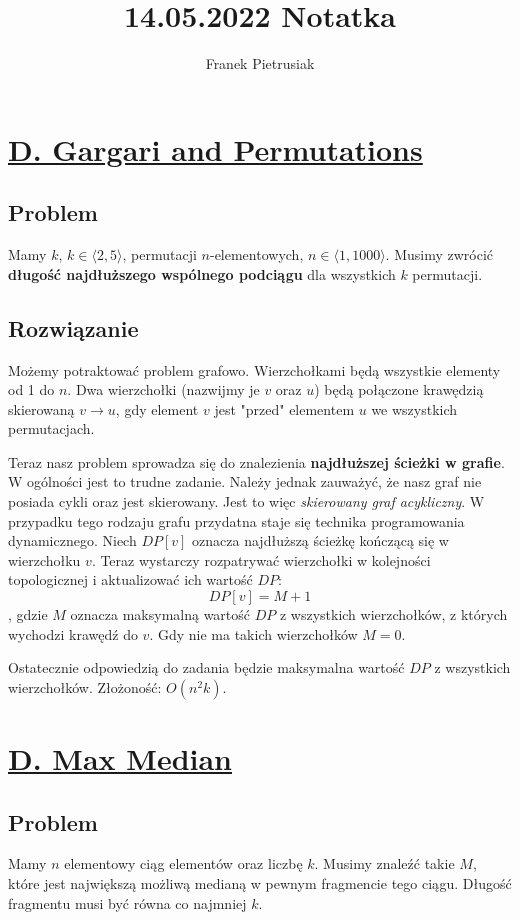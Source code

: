 \documentclass[10pt]{article}
\title{14.05.2022 Notatka}
\author{Franek Pietrusiak}
\begin{document}
\maketitle

\section{\href{https://codeforces.com/problemset/problem/463/D}{D. Gargari and Permutations}}
\subsection{Problem}
Mamy $k$, $k \in \langle 2, 5 \rangle$, permutacji $n$-elementowych, $n \in \langle 1, 1000 \rangle$. Musimy zwrócić \textbf{długość najdłuższego wspólnego podciągu} dla wszystkich $k$ permutacji.

\subsection{Rozwiązanie}
Możemy potraktować problem grafowo. Wierzchołkami będą wszystkie elementy od 1 do $n$. Dwa wierzchołki (nazwijmy je $v$ oraz $u$) będą połączone krawędzią skierowaną $v \to u$, gdy element $v$ jest "przed" elementem $u$ we wszystkich permutacjach.

Teraz nasz problem sprowadza się do znalezienia \textbf{najdłuższej ścieżki w grafie}. W ogólności jest to trudne zadanie. Należy jednak zauważyć, że nasz graf nie posiada cykli oraz jest skierowany. Jest to więc \emph{skierowany graf acykliczny}. W przypadku tego rodzaju grafu przydatna staje się technika programowania dynamicznego. Niech $DP[v]$ oznacza najdłuższą ścieżkę kończącą się w wierzchołku $v$. Teraz wystarczy rozpatrywać wierzchołki w kolejności topologicznej i aktualizować ich wartość $DP$:
$$DP[v] = M + 1$$, gdzie $M$ oznacza maksymalną wartość $DP$ z wszystkich wierzchołków, z których wychodzi krawędź do $v$. Gdy nie ma takich wierzchołków $M = 0$.

Ostatecznie odpowiedzią do zadania będzie maksymalna wartość $DP$ z wszystkich wierzchołków. Złożoność: $O(n^2 k)$.

\section{\href{https://codeforces.com/problemset/problem/1486/D}{D. Max Median}}
\subsection{Problem}
Mamy $n$ elementowy ciąg elementów oraz liczbę $k$. Musimy znaleźć takie $M$, które jest największą możliwą medianą w pewnym fragmencie tego ciągu. Długość fragmentu musi być równa co najmniej $k$.
\end{document}

